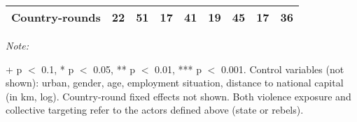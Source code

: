 \begin{table}[!h]
{\begin{threeparttable}
\begin{tabular}[t]{lcccccccc}
Country-rounds & 22 & 51 & 17 & 41 & 19 & 45 & 17 & 36\\
\bottomrule
\end{tabular}
\begin{tablenotes}[para]
\item \textit{Note: } 
\item + p $<$ 0.1, * p $<$ 0.05, ** p $<$ 0.01, *** p $<$ 0.001. Control variables (not shown): urban, gender, age, employment situation, distance to national capital (in km, log). Country-round fixed effects not shown. Both violence exposure and collective targeting refer to the actors defined above (state or rebels).
\end{tablenotes}
\end{threeparttable}}
\end{table}
